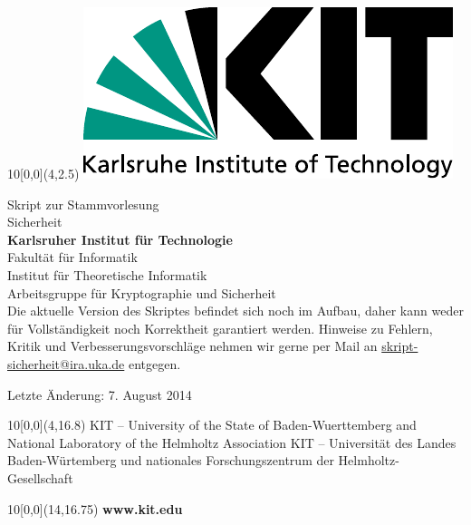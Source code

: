 \newcommand{\diameter}{20}
\newcommand{\xone}{-15}
\newcommand{\xtwo}{160}
\newcommand{\yone}{15}
\newcommand{\ytwo}{-253}

\begin{titlepage}



\begin{textblock}{10}[0,0](4,2.5)
  \includegraphics[width=.3\textwidth]{logos/KITLogo.pdf}
\end{textblock}
\vspace*{3cm}
\begin{center}
  \LARGE{Skript zur Stammvorlesung}
  \vspace*{1.5cm}\\
  \Huge{Sicherheit}\\
  \vspace*{3cm}
  \Large{\textbf{Karlsruher Institut für Technologie}\\
  \vspace*{6mm}
  Fakultät für Informatik\\
  \vspace*{4mm}
  Institut für Theoretische Informatik\\
  Arbeitsgruppe für Kryptographie und Sicherheit}\\
  
  \vspace*{2cm}
  Die aktuelle Version des Skriptes befindet sich noch im Aufbau, daher kann weder für Vollständigkeit noch Korrektheit garantiert werden. Hinweise zu Fehlern, Kritik und Verbesserungsvorschläge nehmen wir gerne per Mail an \url{skript-sicherheit@ira.uka.de} entgegen.
  
  \vspace*{2cm}
  Letzte Änderung: 7. August 2014
\end{center}


\begin{textblock}{10}[0,0](4,16.8)
\tiny{
  {KIT -- University of the State of Baden-Wuerttemberg and National Laboratory of the Helmholtz Association}
  {KIT -- Universität des Landes Baden-Würtemberg und nationales Forschungszentrum der Helmholtz-Gesellschaft}
}
\end{textblock}

\begin{textblock}{10}[0,0](14,16.75)
\large{
  \textbf{www.kit.edu}
}
\end{textblock}

\end{titlepage}

